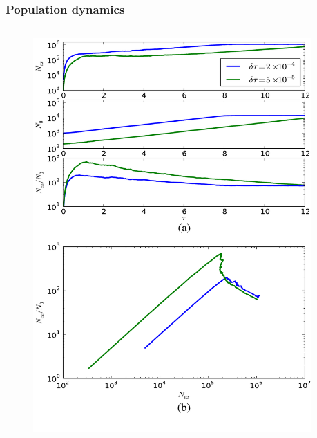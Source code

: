 \documentclass{beamer}
\begin{document}
\begin{frame}
\frametitle{Population dynamics}

\begin{columns}
\begin{column}{0.60\textwidth}
	\begin{center}
		\begin{figure}
			\includegraphics[scale=0.20]{thomEG}
		\end{figure}
	\end{center}
\end{column}
\begin{column}{0.40\textwidth}

\end{column}
\end{columns}
\end{frame}
\end{document}
